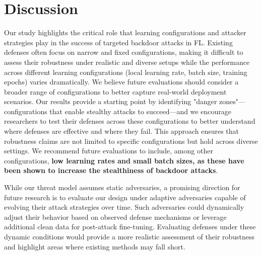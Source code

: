 \section{Discussion}
\label{sec:discussion}

Our study highlights the critical role that learning configurations and attacker strategies play in the success of targeted backdoor attacks in FL. Existing defenses often focus on narrow and fixed configurations, making it difficult to assess their robustness under realistic and diverse setups while the performance across different learning configurations (\ie local learning rate, batch size, training epochs) varies dramatically. We believe future evaluations should consider a broader range of configurations to better capture real-world deployment scenarios. Our results provide a starting point by identifying "danger zones"—configurations that enable stealthy attacks to succeed—and we encourage researchers to test their defenses across these configurations to better understand where defenses are effective and where they fail. This approach ensures that robustness claims are not limited to specific configurations but hold across diverse settings. We recommend future evaluations to include, among other configurations, \textbf{low learning rates and small batch sizes, as these have been shown to increase the stealthiness of backdoor attacks}. 

While our threat model assumes static adversaries, a promising direction for future research is to evaluate our design under adaptive adversaries capable of evolving their attack strategies over time. Such adversaries could dynamically adjust their behavior based on observed defense mechanisms or leverage additional clean data for post-attack fine-tuning. Evaluating defenses under these dynamic conditions would provide a more realistic assessment of their robustness and highlight areas where existing methods may fall short.  


